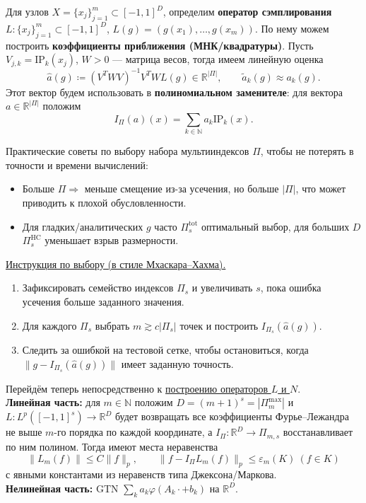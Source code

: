 \documentclass[../NDCNNAI_main.tex]{subfiles}
\begin{document}
Для узлов $X = \{x_j\}_{j=1}^m \subset [-1,1]^D$, определим \textbf{оператор сэмплирования} $L\colon \{x_j\}_{j=1}^m \subset [-1,1]^D$, $L(g) = (g(x_1), \dots, g(x_m))$.
По нему можем построить \textbf{коэффициенты приближения (МНК/квадратуры)}.
Пусть $V_{j,k} = \mathrm{IP}_k(x_j)$, $W > 0$ --- матрица весов, тогда имеем линейную оценка
$$\hat{a}(g) \coloneqq (V^T W V)^{-1} V^T W L(g) \in \mathbb{R}^{|\Pi|}, \qquad \tilde{a}_k(g) \approx a_k(g).$$
Этот вектор будем использовать в \textbf{полиномиальном заменителе}: для вектора $a \in \mathbb{R}^{|\Pi|}$ положим
$$I_\Pi(a)(x) = \sum_{k \in \mathbb{N}} a_k \mathrm{IP}_k(x).$$

\begin{remark}[О выборе $\Pi$]
  Практические советы по выбору набора мультииндексов $\Pi$, чтобы не потерять в точности и времени вычислений:
  \begin{itemize}
    \item Больше $\Pi \Rightarrow$ меньше смещение из-за усечения, но больше $|\Pi|$, что может приводить к плохой обусловленности.
    \item Для гладких/аналитических $g$ часто $\Pi_s^{\text{tot}}$ оптимальный выбор, для больших $D$ $\Pi_s^{\text{HC}}$ уменьшает взрыв размерности.
  \end{itemize}
  \underline{Инструкция по выбору (в стиле Мхаскара--Хахма).}
  \begin{enumerate}
    \item Зафиксировать семейство индексов $\Pi_s$ и увеличивать $s$, пока ошибка усечения больше заданного значения.
    \item Для каждого $\Pi_s$ выбрать $m \gtrsim c|\Pi_s|$ точек и построить $I_{\Pi_s}(\hat{a}(g))$.
    \item Следить за ошибкой на тестовой сетке, чтобы остановиться, когда $\|g - I_{\Pi_s}(\hat{a}(g))\|$ имеет заданную точность.
  \end{enumerate}
\end{remark}

Перейдём теперь непосредственно к \underline{построению операторов $L$ и $N$}.\\
\textbf{Линейная часть:} для $m \in \mathbb{N}$ положим $D = (m + 1)^s = |\Pi_m^{\max}|$ и $L\colon L^p([-1, 1]^s) \to \mathbb{R}^D$ будет возвращать все коэффициенты Фурье--Лежандра не выше $m$-го порядка по каждой координате, а $I_\Pi\colon \mathbb{R}^D \to \Pi_{m, s}$ восстанавливает по ним полином.
Тогда имеют места неравенства
$$\|L_m(f)\| \le C \|f\|_p, \qquad \|f - I_\Pi L_m(f)\|_p \le \varepsilon_m(K) \ (f \in K)$$
с явными константами из неравенств типа Джексона/Маркова.\\
\textbf{Нелинейная часть:} GTN $\sum_k a_k \varphi(A_k \cdot + b_k)$ на $\mathbb{R}^D$.
\end{document}
